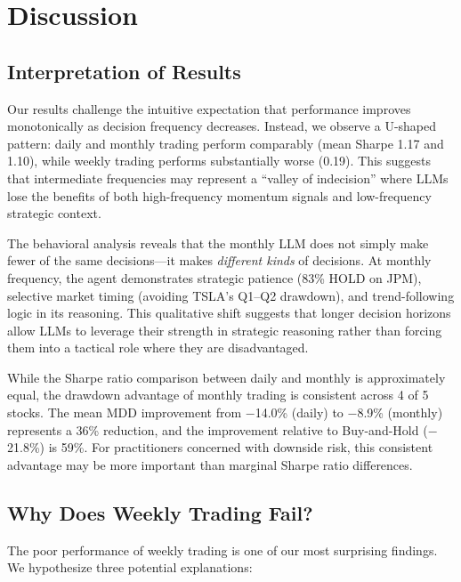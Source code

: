 \section{Discussion}
\label{sec:discussion}

\subsection{Interpretation of Results}

Our results challenge the intuitive expectation that performance improves monotonically as decision frequency decreases. Instead, we observe a U-shaped pattern: daily and monthly trading perform comparably (mean Sharpe 1.17 and 1.10), while weekly trading performs substantially worse (0.19). This suggests that intermediate frequencies may represent a ``valley of indecision'' where LLMs lose the benefits of both high-frequency momentum signals and low-frequency strategic context.

The behavioral analysis reveals that the monthly LLM does not simply make fewer of the same decisions---it makes \emph{different kinds} of decisions. At monthly frequency, the agent demonstrates strategic patience (83\% HOLD on JPM), selective market timing (avoiding TSLA's Q1--Q2 drawdown), and trend-following logic in its reasoning. This qualitative shift suggests that longer decision horizons allow LLMs to leverage their strength in strategic reasoning rather than forcing them into a tactical role where they are disadvantaged.

While the Sharpe ratio comparison between daily and monthly is approximately equal, the drawdown advantage of monthly trading is consistent across 4 of 5 stocks. The mean MDD improvement from $-$14.0\% (daily) to $-$8.9\% (monthly) represents a 36\% reduction, and the improvement relative to Buy-and-Hold ($-$21.8\%) is 59\%. For practitioners concerned with downside risk, this consistent advantage may be more important than marginal Sharpe ratio differences.

\subsection{Why Does Weekly Trading Fail?}

The poor performance of weekly trading is one of our most surprising findings. We hypothesize three potential explanations:

